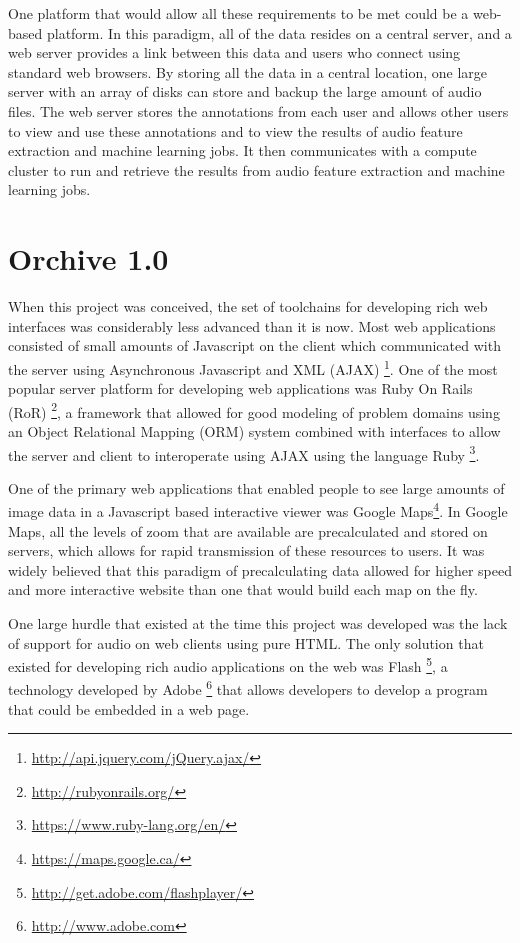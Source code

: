 One platform that would allow all these requirements to be met could
be a web-based platform.  In this paradigm, all of the data resides on
a central server, and a web server provides a link between this data
and users who connect using standard web browsers.  By storing all the
data in a central location, one large server with an array of disks
can store and backup the large amount of audio files.  The web server
stores the annotations from each user and allows other users to view
and use these annotations and to view the results of audio feature
extraction and machine learning jobs.  It then communicates with a
compute cluster to run and retrieve the results from audio feature
extraction and machine learning jobs.


\section{Orchive 1.0}
\label{section:softwareAndSystems:orchiveV1}

When this project was conceived, the set of toolchains for developing
rich web interfaces was considerably less advanced than it is now.
Most web applications consisted of small amounts of Javascript on the
client which communicated with the server using Asynchronous
Javascript and XML
(AJAX) \footnote{\url{http://api.jquery.com/jQuery.ajax/}}.  One of
the most popular server platform for developing web applications was
Ruby On Rails (RoR) \footnote{\url{http://rubyonrails.org/}}, a
framework that allowed for good modeling of problem domains using an
Object Relational Mapping (ORM) system combined with interfaces to
allow the server and client to interoperate using AJAX using the
language Ruby \footnote{\url{https://www.ruby-lang.org/en/}}.

One of the primary web applications that enabled people to see large
amounts of image data in a Javascript based interactive viewer was
Google Maps\footnote{\url{https://maps.google.ca/}}.  In Google Maps,
all the levels of zoom that are available are precalculated and stored
on servers, which allows for rapid transmission of these resources to
users.  It was widely believed that this paradigm of precalculating
data allowed for higher speed and more interactive website than one
that would build each map on the fly.

One large hurdle that existed at the time this project was developed
was the lack of support for audio on web clients using pure HTML.  The
only solution that existed for developing rich audio applications on
the web was Flash \footnote{\url{http://get.adobe.com/flashplayer/}},
a technology developed by Adobe \footnote{\url{http://www.adobe.com}}
that allows developers to develop a program that could be embedded in
a web page.


